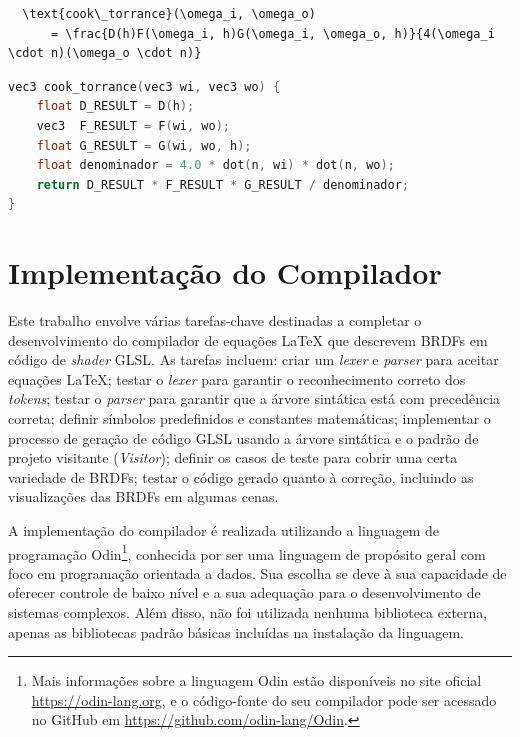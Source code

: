 \begin{codigo}[H]
\caption{\small Entrada em \LaTeX\  (Cook-Torrance BRDF).}
\label{cod-input-latex}
\begin{lstlisting}
  \text{cook\_torrance}(\omega_i, \omega_o)
      = \frac{D(h)F(\omega_i, h)G(\omega_i, \omega_o, h)}{4(\omega_i \cdot n)(\omega_o \cdot n)}
\end{lstlisting}
\end{codigo}


\begin{codigo}[H]
\caption{\small Saída em GLSL esperada (Cook-Torrance BRDF).}
\label{cod-glsl-esperado}
\begin{lstlisting}[language=C]
vec3 cook_torrance(vec3 wi, vec3 wo) {
    float D_RESULT = D(h);
    vec3  F_RESULT = F(wi, wo);
    float G_RESULT = G(wi, wo, h);
    float denominador = 4.0 * dot(n, wi) * dot(n, wo);
    return D_RESULT * F_RESULT * G_RESULT / denominador;
}
\end{lstlisting}
\end{codigo}


\section{Implementação do Compilador} \label{compiladorimplementacao}

Este trabalho envolve várias tarefas-chave destinadas a completar o desenvolvimento do compilador de equações \LaTeX{}  que descrevem BRDFs em código de \textit{shader} GLSL. As tarefas incluem: criar um \textit{lexer} e \textit{parser} para aceitar equações \LaTeX{}; testar o \textit{lexer} para garantir o reconhecimento correto dos \textit{tokens}; testar o \textit{parser} para garantir que a árvore sintática está com precedência correta; definir símbolos predefinidos e constantes matemáticas; implementar o processo de geração de código GLSL usando a árvore sintática e o padrão de projeto visitante (\textit{Visitor}); definir os casos de teste para cobrir uma certa variedade de BRDFs; testar o código gerado quanto à correção, incluindo as visualizações das BRDFs em algumas cenas.


A implementação do compilador é realizada utilizando a linguagem de programação Odin\footnote{Mais informações sobre a linguagem Odin estão disponíveis no site oficial \url {https://odin-lang.org}, e o código-fonte do seu compilador pode ser acessado no GitHub em \url{https://github.com/odin-lang/Odin}.}, conhecida por ser uma linguagem de propósito geral com foco em programação orientada a dados. Sua escolha se deve à sua capacidade de oferecer controle de baixo nível e a sua adequação para o desenvolvimento de sistemas complexos. Além disso, não foi utilizada nenhuma biblioteca externa, apenas as bibliotecas padrão básicas incluídas na instalação da linguagem.



